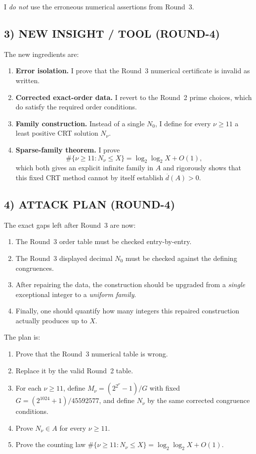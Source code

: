 I \emph{do not} use the erroneous numerical assertions from Round~3.

\subsection*{3) NEW INSIGHT / TOOL (ROUND-4)}

The new ingredients are:

\begin{enumerate}
\item \textbf{Error isolation.} I prove that the Round~3 numerical certificate is invalid as written.
\item \textbf{Corrected exact-order data.} I revert to the Round~2 prime choices, which do satisfy the required order conditions.
\item \textbf{Family construction.} Instead of a single $N_0$, I define for every $\nu\ge 11$ a least positive CRT solution $N_\nu$.
\item \textbf{Sparse-family theorem.} I prove
\[
\#\{\nu\ge 11:N_\nu\le X\}=\log_2\log_2 X+O(1),
\]
which both gives an explicit infinite family in $A$ and rigorously shows that this fixed CRT method cannot by itself establish $\overline d(A)>0$.
\end{enumerate}

\subsection*{4) ATTACK PLAN (ROUND-4)}

The exact gaps left after Round~3 are now:

\begin{enumerate}
\item The Round~3 order table must be checked entry-by-entry.
\item The Round~3 displayed decimal $N_0$ must be checked against the defining congruences.
\item After repairing the data, the construction should be upgraded from a \emph{single} exceptional integer to a \emph{uniform family}.
\item Finally, one should quantify how many integers this repaired construction actually produces up to $X$.
\end{enumerate}

The plan is:

\begin{enumerate}
\item Prove that the Round~3 numerical table is wrong.
\item Replace it by the valid Round~2 table.
\item For each $\nu\ge 11$, define $M_\nu=(2^{2^\nu}-1)/G$ with fixed $G=(2^{1024}+1)/45592577$, and define $N_\nu$ by the same corrected congruence conditions.
\item Prove $N_\nu\in A$ for every $\nu\ge 11$.
\item Prove the counting law $\#\{\nu\ge 11:N_\nu\le X\}=\log_2\log_2 X+O(1)$.
\end{enumerate}

